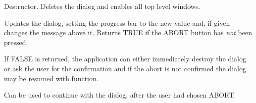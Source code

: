 
Destructor.
Deletes the dialog and enables all top level windows.

\label{wxprogressdialogupdate}


Updates the dialog, setting the progress bar to the new value and, if
given changes the message above it. Returns TRUE if the ABORT button 
has \emph{not} been pressed.

If FALSE is returned, the application can either immediately destroy the dialog
or ask the user for the confirmation and if the abort is not confirmed the
dialog may be resumed with  function.


\label{wxprogressdialogresume}


Can be used to continue with the dialog, after the user had chosen
ABORT.


